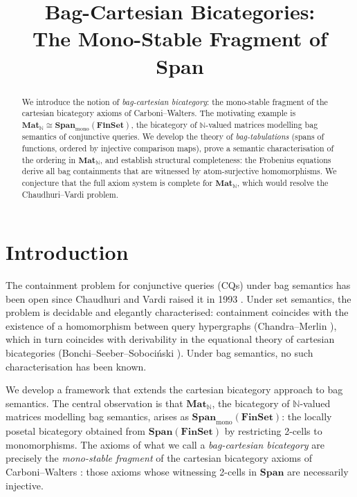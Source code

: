 \documentclass[11pt,a4paper]{article}
\title{\textbf{Bag-Cartesian Bicategories:\\ The Mono-Stable Fragment of Span}}
\author{}
\date{}
\theoremstyle{definition}
\newcommand{\Span}{\mathbf{Span}}
\newcommand{\Mat}{\mathbf{Mat}}
\newcommand{\FinSet}{\mathbf{FinSet}}
\newcommand{\N}{\mathbb{N}}
\begin{document}
\maketitle

\begin{abstract}
We introduce the notion of \emph{bag-cartesian bicategory}: the mono-stable fragment of the cartesian bicategory axioms of Carboni--Walters. The motivating example is $\Mat_\N \cong \Span_{\mathrm{mono}}(\FinSet)$, the bicategory of $\N$-valued matrices modelling bag semantics of conjunctive queries. We develop the theory of \emph{bag-tabulations} (spans of functions, ordered by injective comparison maps), prove a semantic characterisation of the ordering in $\Mat_\N$, and establish structural completeness: the Frobenius equations derive all bag containments that are witnessed by atom-surjective homomorphisms. We conjecture that the full axiom system is complete for $\Mat_\N$, which would resolve the Chaudhuri--Vardi problem.
\end{abstract}

\tableofcontents

\section{Introduction}

The containment problem for conjunctive queries (CQs) under bag semantics has been open since Chaudhuri and Vardi raised it in 1993 \cite{CV}. Under set semantics, the problem is decidable and elegantly characterised: containment coincides with the existence of a homomorphism between query hypergraphs (Chandra--Merlin \cite{CM}), which in turn coincides with derivability in the equational theory of cartesian bicategories (Bonchi--Seeber--Soboci\'nski \cite{BSS}). Under bag semantics, no such characterisation has been known.

We develop a framework that extends the cartesian bicategory approach to bag semantics. The central observation is that $\Mat_\N$, the bicategory of $\N$-valued matrices modelling bag semantics, arises as $\Span_{\mathrm{mono}}(\FinSet)$: the locally posetal bicategory obtained from $\Span(\FinSet)$ by restricting 2-cells to monomorphisms. The axioms of what we call a \emph{bag-cartesian bicategory} are precisely the \emph{mono-stable fragment} of the cartesian bicategory axioms of Carboni--Walters \cite{CW,CKWW}: those axioms whose witnessing 2-cells in $\Span$ are necessarily injective.
\end{document}
